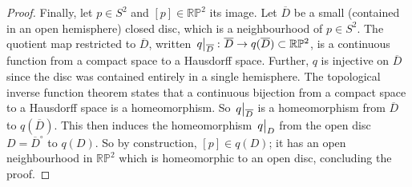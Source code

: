 \begin{example}
\begin{proof}
		Finally, let \( p \in S^2 \) and \( [p] \in \mathbb R \mathbb P^2 \) its image.
		Let \( \overline D \) be a small (contained in an open hemisphere) closed disc, which is a neighbourhood of \( p \in S^2 \).
		The quotient map restricted to \( \overline D \), written \( \eval{q}_{\overline D} \colon \overline D \to q(\overline D) \subset \mathbb R \mathbb P^2 \), is a continuous function from a compact space to a Hausdorff space.
		Further, \( q \) is injective on \( \overline D \) since the disc was contained entirely in a single hemisphere.
		The topological inverse function theorem states that a continuous bijection from a compact space to a Hausdorff space is a homeomorphism.
		So \( \eval{q}_{\overline D} \) is a homeomorphism from \( \overline D \) to \( q(\overline D) \).
		This then induces the homeomorphism \( \eval{q}_{D} \) from the open disc \( D = {\overline D}^\circ \) to \( q(D) \).
		So by construction, \( [p] \in q(D) \); it has an open neighbourhood in \( \mathbb R \mathbb P^2 \) which is homeomorphic to an open disc, concluding the proof.
	\end{proof}
\end{example}
